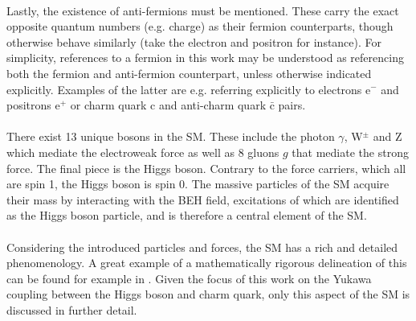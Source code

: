 \\
Lastly, the existence of anti-fermions must be mentioned. These carry the exact opposite quantum numbers (e.g. charge) as their fermion counterparts, though otherwise behave similarly (take the electron and positron for instance). For simplicity, references to a fermion in this work may be understood as referencing both the fermion and anti-fermion counterpart, unless otherwise indicated explicitly. Examples of the latter are e.g. referring explicitly to electrons e$^{-}$ and positrons e$^{+}$ or charm quark c and anti-charm quark $\bar{\mathrm{c}}$ pairs. \\
\\
There exist 13 unique bosons in the SM. These include the photon $\gamma$, W$^{\pm}$ and Z which mediate the electroweak force as well as 8 gluons $g$ that mediate the strong force. The final piece is the Higgs boson. Contrary to the force carriers, which all are spin 1, the Higgs boson is spin 0. The massive particles of the SM acquire their mass by interacting with the BEH field, excitations of which are identified as the Higgs boson particle, and is therefore a central element of the SM. \\
\\
Considering the introduced particles and forces, the SM has a rich and detailed phenomenology. A great example of a mathematically rigorous delineation of this can be found for example in \cite{PeskinSchroeder}. Given the focus of this work on the Yukawa coupling between the Higgs boson and charm quark, only this aspect of the SM is discussed in further detail.

